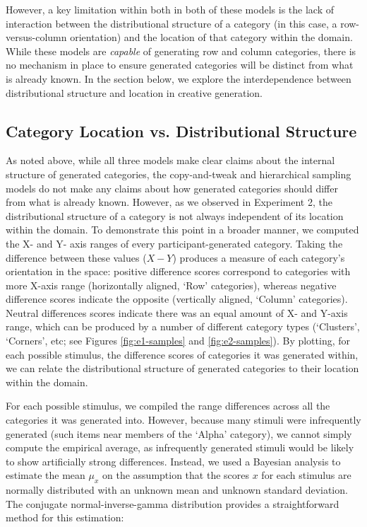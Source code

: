 \documentclass[12pt]{article}
\begin{document}
\begin{flushleft}
However, a key limitation within both in both of these models is the lack of interaction between the distributional structure of a category (in this case, a row-versus-column orientation) and the location of that category within the domain. While these models are {\em capable} of generating row and column categories, there is no mechanism in place to ensure generated categories will be distinct from what is already known. In the section below, we explore the interdependence between distributional structure and location in creative generation.

\subsection{Category Location vs. Distributional Structure}

As noted above, while all three models make clear claims about the internal structure of generated categories, the copy-and-tweak and hierarchical sampling models do not make any claims about how generated categories should differ from what is already known. However, as we observed in Experiment 2, the distributional structure of a category is not always independent of its location within the domain. To demonstrate this point in a broader manner, we computed the X- and Y- axis ranges of every participant-generated category. Taking the difference between these values ($X-Y$) produces a measure of each category's orientation in the space: positive difference scores correspond to categories with more X-axis range (horizontally aligned, `Row' categories), whereas negative difference scores indicate the opposite (vertically aligned, `Column' categories). Neutral differences scores indicate there was an equal amount of X- and Y-axis range, which can be produced by a number of different category types (`Clusters', `Corners', etc; see Figures \ref{fig:e1-samples} and \ref{fig:e2-samples}). By plotting, for each possible stimulus, the difference scores of categories it was generated within, we can relate the distributional structure of generated categories to their location within the domain.

For each possible stimulus, we compiled the range differences across all the categories it was generated into. However, because many stimuli were infrequently generated (such items near members of the `Alpha' category), we cannot simply compute the empirical average, as infrequently generated stimuli would be likely to show artificially strong differences. Instead, we used a Bayesian analysis to estimate the mean $\mu_x$ on the assumption that the scores $x$ for each stimulus are normally distributed with an unknown mean and unknown standard deviation. The conjugate normal-inverse-gamma distribution provides a straightforward method for this estimation:



\end{flushleft}
\end{document}
